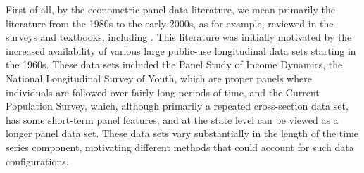 \documentclass[letterpaper,12pt,leqno]{article}
\begin{document}
  
First of all, by the econometric panel data literature, we mean primarily the literature 
from the 1980s to the early 2000s, as for example, reviewed in the surveys and textbooks, including
\citep{chamberlain1982multivariate, chamberlain1984panel, hsiao2022analysis, arellano2003panel, arellano2001panel, baltagi2008econometric, wooldridge2010econometric, arellano2011nonlinear}. This literature was initially motivated by the increased availability of various large public-use longitudinal data sets starting in the 1960s. These data sets included the Panel Study of Income Dynamics, the National Longitudinal Survey of Youth, which are proper panels where individuals are followed over fairly long periods of time, and the Current Population Survey, which, although primarily a repeated cross-section data set, has some short-term panel features, and at the state level can be viewed as a longer panel data set. 
These data sets vary substantially in the length of the time series component, motivating different methods that could account for such data configurations.
\end{document}
